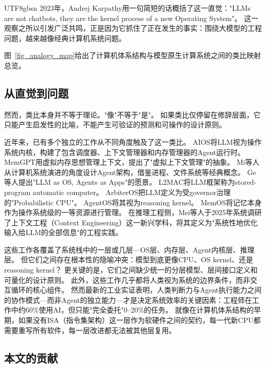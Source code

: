 \documentclass[11pt,a4paper]{article}
\begin{document}
\begin{CJK*}{UTF8}{gbsn}
2023年，Andrej Karpathy用一句简短的话概括了这一直觉："LLMs are not chatbots, they are the kernel process of a new Operating System"\cite{karpathy2023llmos}。
这一观察之所以引发广泛共鸣，正是因为它抓住了正在发生的事实：围绕大模型的工程问题，越来越像经典计算机系统问题。

图~\ref{fig_analogy_map}给出了计算机体系结构与模型原生计算系统之间的类比映射总览。


\subsection{从直觉到问题}

然而，类比本身并不等于理论。"像"不等于"是"。
如果类比仅停留在修辞层面，它只能产生启发性的比喻，不能产生可验证的预测和可操作的设计原则。

近年来，已有多个独立的工作从不同角度触及了这一类比。
AIOS将LLM视为操作系统内核，构建了包含调度器、上下文管理器和内存管理器的Agent运行时\cite{mei2024aios}。
MemGPT用虚拟内存思想管理上下文，提出了"虚拟上下文管理"的抽象\cite{memgpt2023}。
Mi等人从计算机系统演进的角度设计Agent架构，借鉴进程、文件系统等经典概念\cite{mi2025llmagentscomputersystems}。
Ge等人提出"LLM as OS, Agents as Apps"的愿景\cite{ge2023llmos}。
L2MAC将LLM框架称为stored-program automatic computer\cite{holt2024l2mac}。
ArbiterOS把LLM定义为受governor治理的"Probabilistic CPU"\cite{arbiteros2025}。
AgentOS将其视为reasoning kernel\cite{agentos2025}。
MemOS将记忆本身作为操作系统级的一等资源进行管理\cite{memos2025}。
在推理工程侧，Mei等人于2025年系统调研了上下文工程（Context Engineering）这一新兴学科，将其定义为"系统性地优化输入给LLM的全部信息"的工程实践\cite{contextengineer_survey2025}。

这些工作各覆盖了系统栈中的一层或几层---OS层、内存层、Agent内核层、推理层。
但它们之间存在根本性的隐喻冲突：模型到底更像CPU、OS kernel、还是reasoning kernel？
更关键的是，它们之间缺少统一的分层模型、层间接口定义和可量化的设计原则。
此外，这些工作几乎都将人类视为系统的边界条件，而非交互循环的核心组件。
然而最新的工业实证表明，人类判断力与Agent执行能力之间的协作模式---而非Agent的独立能力---才是决定系统效率的关键因素：工程师在工作中约60\%使用AI，但只能"完全委托"0--20\%的任务\cite{anthropic2026agenticreport}。
就像在计算机体系结构的早期，如果没有ISA（指令集架构）这一层作为软硬件之间的契约，每一代新CPU都需要重写所有软件，每一层改进都无法被其他层复用。

\subsection{本文的贡献}


\end{CJK*}
\end{document}
